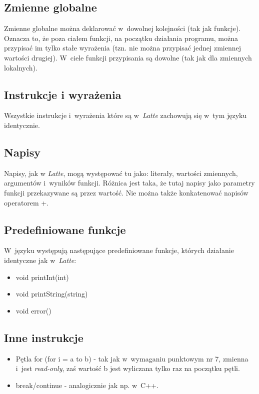 \documentclass{article}
\begin{document}
\subsection{Zmienne globalne}
Zmienne globalne można deklarować w~dowolnej kolejności (tak jak funkcje).
Oznacza to, że poza ciałem funkcji, na początku działania programu, można przypisać im
tylko stałe wyrażenia (tzn. nie można przypisać jednej zmiennej wartości drugiej).
W~ciele funkcji przypisania są dowolne (tak jak dla zmiennych lokalnych).

\subsection{Instrukcje i wyrażenia}
Wszystkie instrukcje i~wyrażenia które są w~\textit{Latte} 
zachowują się w~tym języku identycznie.

\subsection{Napisy}
Napisy, jak w \textit{Latte}, mogą występować tu jako:
literały, wartości zmiennych, argumentów i~wyników funkcji.
Różnica jest taka, że tutaj napisy jako parametry funkcji przekazywane są przez wartość. Nie można także konkatenować napisów operatorem +.

\subsection{Predefiniowane funkcje}
W~języku występują następujące predefiniowane funkcje, 
których działanie identyczne jak w~\textit{Latte}:
\begin{itemize}
    \item void printInt(int)
    \item void printString(string)
    \item void error()
\end{itemize}

\subsection{Inne instrukcje}
\begin{itemize}
    \item Pętla for (for i = a to b) - tak jak w~wymaganiu punktowym nr 7, zmienna i~jest \textit{read-only}, zaś wartość b jest wyliczana tylko raz na początku pętli.
    \item break/continue - analogicznie jak np. w~C++.
\end{itemize}
\end{document}
